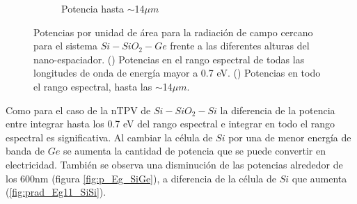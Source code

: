 \begin{figure}[H]
\begin{subfigure}[b]{0.49\textwidth}
	\caption{Potencia hasta $\sim$14$\mu m$}
	\label{fig:p_full_SiGe}
\end{subfigure}
	\caption[Potencias por unidad de área para la radiación de campo cercano para el sistema $Si-SiO_2-Ge$ frente a las diferentes alturas del nano-espaciador]{Potencias por unidad de área para la radiación de campo cercano para el sistema $Si-SiO_2-Ge$ frente a las diferentes alturas del nano-espaciador. () Potencias en el rango espectral de todas las longitudes de onda de energía mayor a 0.7 eV. () Potencias en todo el rango espectral, hasta las $\sim$14$\mu m$.}
	\label{fig:p_SiGe}
\end{figure}
Como para el caso de la nTPV de $Si-SiO_2-Si$ la diferencia de la potencia entre integrar hasta los 0.7 eV del rango espectral e integrar en todo el rango espectral es significativa. Al cambiar la célula de $Si$ por una de menor energía de banda de $Ge$ se aumenta la cantidad de potencia que se puede convertir en electricidad. También se observa una disminución de las potencias alrededor de los 600nm (figura \ref{fig:p_Eg_SiGe}), a diferencia de la célula de $Si$ que aumenta (\ref{fig:prad_Eg11_SiSi}).
